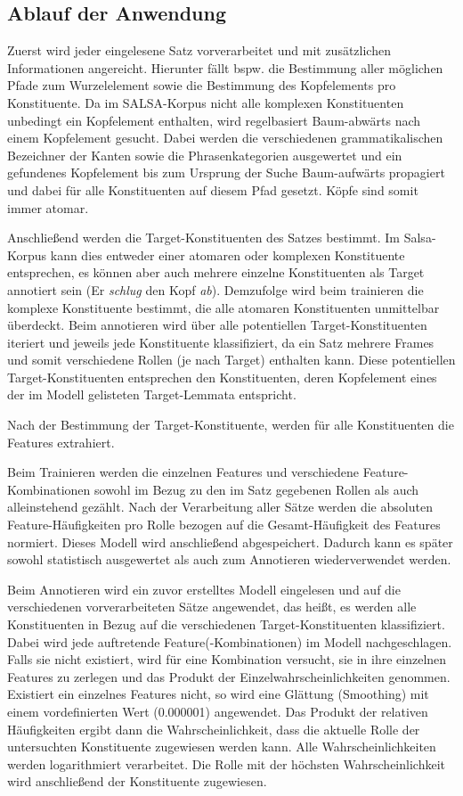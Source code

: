 \documentclass[12pt]{article}
\begin{document}
\subsection{Ablauf der Anwendung}

Zuerst wird jeder eingelesene Satz vorverarbeitet und mit zusätzlichen Informationen
angereicht. Hierunter fällt bspw. die Bestimmung aller möglichen Pfade zum Wurzelelement sowie die Bestimmung des Kopfelements pro
Konstituente. Da im
SALSA-Korpus nicht alle komplexen Konstituenten unbedingt ein Kopfelement
enthalten, wird regelbasiert Baum-abwärts nach einem Kopfelement gesucht. Dabei
werden die verschiedenen grammatikalischen Bezeichner der Kanten sowie die Phrasenkategorien
ausgewertet und ein gefundenes Kopfelement bis zum Ursprung der Suche
Baum-aufwärts propagiert und dabei für alle Konstituenten auf diesem Pfad gesetzt. Köpfe sind somit immer atomar.

Anschließend werden die Target-Konstituenten des Satzes bestimmt. Im
Salsa-Korpus kann dies entweder einer atomaren oder komplexen Konstituente entsprechen, es können aber auch mehrere einzelne Konstituenten als Target annotiert sein (\glqq{}Er \textit{schlug}
den Kopf \textit{ab}\grqq{}). Demzufolge wird beim trainieren die komplexe Konstituente
bestimmt, die alle atomaren Konstituenten unmittelbar überdeckt. 
Beim annotieren wird über alle
potentiellen Target-Konstituenten iteriert und jeweils jede Konstituente klassifiziert, da ein Satz mehrere Frames und somit
verschiedene Rollen (je nach Target) enthalten kann. Diese potentiellen
Target-Konstituenten entsprechen den Konstituenten, deren Kopfelement eines der
im Modell gelisteten Target-Lemmata entspricht.

Nach der Bestimmung der Target-Konstituente, werden für alle Konstituenten die
Features extrahiert.

Beim Trainieren werden die einzelnen Features und verschiedene
Feature-Kombinationen sowohl im Bezug zu den im Satz gegebenen
Rollen als auch alleinstehend gezählt. Nach der Verarbeitung aller Sätze werden die absoluten
Feature-Häufigkeiten pro Rolle bezogen auf die Gesamt-Häufigkeit des Features
normiert. Dieses Modell wird anschließend abgespeichert. Dadurch kann es später
sowohl statistisch ausgewertet als auch zum Annotieren wiederverwendet werden.

Beim Annotieren wird ein zuvor erstelltes Modell eingelesen und auf die
verschiedenen vorverarbeiteten Sätze angewendet, das heißt, es werden alle Konstituenten in Bezug auf die verschiedenen
Target-Konstituenten klassifiziert. Dabei wird jede auftretende Feature(-Kombinationen) im
Modell nachgeschlagen. Falls sie nicht existiert, wird für eine Kombination
versucht, sie in ihre einzelnen Features zu zerlegen und das Produkt
der Einzelwahrscheinlichkeiten genommen. Existiert ein einzelnes Features nicht, so
wird eine Glättung (\glqq{}Smoothing\grqq{}) mit einem vordefinierten Wert
(0.000001) angewendet. Das Produkt der relativen Häufigkeiten ergibt dann die Wahrscheinlichkeit, dass die aktuelle Rolle der untersuchten Konstituente zugewiesen werden kann. 
Alle Wahrscheinlichkeiten werden logarithmiert verarbeitet. Die Rolle mit der
höchsten Wahrscheinlichkeit wird anschließend der Konstituente zugewiesen.
\end{document}
